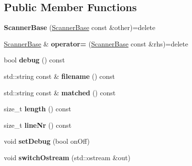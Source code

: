 \subsection*{Public Member Functions}
\begin{DoxyCompactItemize}
\item 
\hypertarget{classScannerBase_a52dace818f491ca943e37e5dafd4c61a}{{\bfseries Scanner\+Base} (\hyperlink{classScannerBase}{Scanner\+Base} const \&other)=delete}\label{classScannerBase_a52dace818f491ca943e37e5dafd4c61a}

\item 
\hypertarget{classScannerBase_a8bba721b91214ec1c7f08d8602789ee9}{\hyperlink{classScannerBase}{Scanner\+Base} \& {\bfseries operator=} (\hyperlink{classScannerBase}{Scanner\+Base} const \&rhs)=delete}\label{classScannerBase_a8bba721b91214ec1c7f08d8602789ee9}

\item 
\hypertarget{classScannerBase_a77130b2ae81f92960bfd49c7fcf05d8d}{bool {\bfseries debug} () const }\label{classScannerBase_a77130b2ae81f92960bfd49c7fcf05d8d}

\item 
\hypertarget{classScannerBase_ab23eaadc4d45bdc3b67226f9010e836b}{std\+::string const \& {\bfseries filename} () const }\label{classScannerBase_ab23eaadc4d45bdc3b67226f9010e836b}

\item 
\hypertarget{classScannerBase_a13c5167ad30e8d89b181ceb40b91a9b7}{std\+::string const \& {\bfseries matched} () const }\label{classScannerBase_a13c5167ad30e8d89b181ceb40b91a9b7}

\item 
\hypertarget{classScannerBase_ad9ad6a5818e6f37d05e6c8b06afcd90b}{size\+\_\+t {\bfseries length} () const }\label{classScannerBase_ad9ad6a5818e6f37d05e6c8b06afcd90b}

\item 
\hypertarget{classScannerBase_ab55926b7d06e99f1d3a8cd410cc544aa}{size\+\_\+t {\bfseries line\+Nr} () const }\label{classScannerBase_ab55926b7d06e99f1d3a8cd410cc544aa}

\item 
\hypertarget{classScannerBase_aef0df93b2a8d97fb61a5d282bddad859}{void {\bfseries set\+Debug} (bool on\+Off)}\label{classScannerBase_aef0df93b2a8d97fb61a5d282bddad859}

\item 
\hypertarget{classScannerBase_a6248d6f0d8ac1926a3666a1542390370}{void {\bfseries switch\+Ostream} (std\+::ostream \&out)}\label{classScannerBase_a6248d6f0d8ac1926a3666a1542390370}


\end{DoxyCompactItemize}

